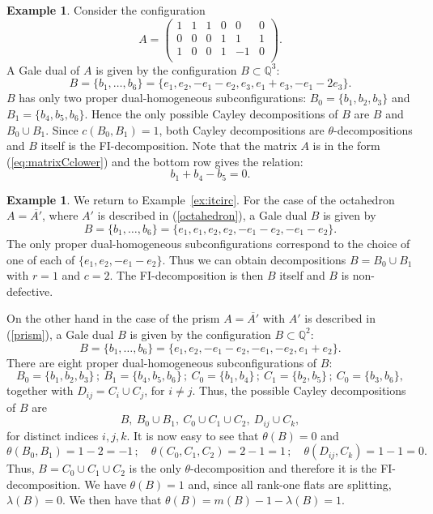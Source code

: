 \documentclass[11pt]{amsart}
\theoremstyle{plain}
\theoremstyle{definition}
\newtheorem{example}[theorem]{Example}
\theoremstyle{remark}
\newcommand{\baseRing}[1]{\ensuremath{\mathbb{#1}}}
\newcommand{\Q}{\baseRing{Q}}
\numberwithin{equation}{section}
\begin{document}
\begin{example} Consider the configuration 
$$
A =  \left(\begin{array}{cccccc}
1 & 1 &1 & 0 & 0&0\\
0 & 0&0 &1&1&1\\
1 & 0&0 &1&-1&0\\
\end{array}\right).$$
A Gale dual of $A$ is given by the configuration $B \subset \Q^3$:
$$B = \{b_1,\dots,b_6\}=\{e_1, e_2, -e_1 - e_2, e_3, e_1 + e_3, -e_1 - 2e_3\}.$$
$B$ has only two proper dual-homogeneous subconfigurations: 
$B_0 =  \{b_1,b_2,b_3\}$ and $ B_1 =  \{b_4,b_5,b_6\}$.  Hence the only  possible Cayley decompositions of $B$ are
$B$ and $B_0 \cup B_1$.  Since $c(B_0,B_1) = 1$, both Cayley decompositions are $\theta$-decompositions and $B$ itself is the FI-decomposition.  
Note that the matrix $A$ is in the form (\ref{eq:matrixCclower}) and the bottom row gives the relation:
$$b_1 + b_4 - b_5 =0.$$
\end{example}


\begin{example} \label{ex:return}
We return to Example~\ref{ex:itcirc}.  
For the case of the octahedron $A = \overline{A'}$, where $A'$ is described in (\ref{octahedron}), a Gale dual $B$ is given by 
$$B = \{b_1,\dots,b_6\}=\{e_1, e_1, e_2, e_2, -e_1 - e_2,  -e_1 - e_2\}.$$
The only proper dual-homogeneous subconfigurations correspond to the choice of one of each of $\{e_1,e_2,-e_1-e_2\}$. 
Thus we can obtain decompositions 
$B = B_0 \cup B_1$ with $r=1$ and $c=2$.  The FI-decomposition is then $B$ itself and $B$ is non-defective.

On the other hand in the case of the prism $A = \overline{A'}$ with $A'$ is described in (\ref{prism}), a Gale dual $B$ is given by
the configuration $B \subset \Q^2$:
$$B = \{b_1,\dots,b_6\}=\{e_1, e_2, -e_1 - e_2, -e_1, -e_2, e_1 + e_2\}.$$
There are eight proper dual-homogeneous subconfigurations of $B$:
$$B_0 =  \{b_1,b_2,b_3\}\,;\ B_1 =  \{b_4,b_5,b_6\}\,;\ C_0 =\{b_1,b_4\}\,;\ C_1 =\{b_2,b_5\}\,;\ C_0 =\{b_3,b_6\},$$
together with $D_{ij} = C_i \cup C_j$, for $i\not=j$.
Thus, the possible Cayley decompositions of $B$ are
$$B,\ B_0 \cup B_1,\ C_0 \cup C_1 \cup C_2,\ D_{ij}\cup C_k,$$
for distinct indices $i,j,k$.  It is now easy to see that $\theta(B)=0$ and
$$\theta(B_0,B_1) = 1-2=-1\,;\quad \theta(C_0,C_1,C_2) = 2-1=1\,;\quad \theta(D_{ij},C_k) = 1-1=0.$$
Thus, $B = C_0 \cup C_1 \cup C_2$ is the only $\theta$-decomposition and therefore it  is the FI-decomposition. 
We have $\theta(B) = 1$ and, since all rank-one flats are splitting, $\lambda(B) = 0$. We then have that
$\theta(B) = m(B) -1 - \lambda(B)=1$. 

\end{example}
\end{document}
